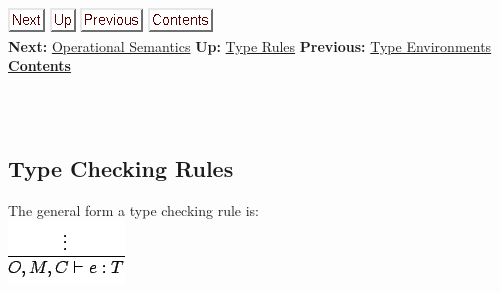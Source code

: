 \documentclass[]{article}
\begin{document}
\href{node44.html}{\includegraphics{next.png}}
\href{node41.html}{\includegraphics{up.png}}
\href{node42.html}{\includegraphics{prev.png}}
\href{node1.html}{\includegraphics{contents.png}} \\ \textbf{Next:}
\href{node44.html}{Operational Semantics} \textbf{Up:}
\href{node41.html}{Type Rules} \textbf{Previous:}
\href{node42.html}{Type Environments} ~
\textbf{\href{node1.html}{Contents}} \\ \\

\subsection{\\ Type Checking Rules}

The general form a type checking rule is: \\

\includegraphics{img69.png}
\end{document}

